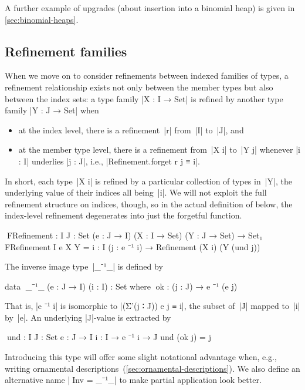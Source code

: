 
A further example of upgrades (about insertion into a binomial heap) is given in \autoref{sec:binomial-heaps}.

\subsection{Refinement families}
\label{sec:refinement-families}

When we move on to consider refinements between indexed families of types, a refinement relationship exists not only between the member types but also between the index sets: a type family |X : I → Set| is refined by another type family |Y : J → Set| when
\begin{itemize}
\item at the index level, there is a refinement~|r| from~|I| to~|J|, and
\item at the member type level, there is a refinement from~|X i| to~|Y j| whenever |i : I| underlies |j : J|, i.e., |Refinement.forget r j ≡ i|.
\end{itemize}
In short, each type~|X i| is refined by a particular collection of types in~|Y|, the underlying value of their indices all being~|i|.
We will not exploit the full refinement structure on indices, though, so in the actual definition of  below, the index-level refinement degenerates into just the forgetful function.
\begin{code}
^^^FRefinement : {I J : Set} (e : J → I) (X : I → Set) (Y : J → Set) → Set₁
FRefinement {I} e X Y = {i : I} (j : e ⁻¹ i) → Refinement (X i) (Y (und j))
\end{code}
The inverse image type~|_⁻¹_| is defined by
\begin{code}
data ^^^_⁻¹_ (e : J → I) (i : I) : Set where
  ^^^ok : (j : J) → e ⁻¹ (e j)
\end{code}
That is, |e ⁻¹ i| is isomorphic to |(Σ'(j ∶ J)) e j ≡ i|, the subset of~|J| mapped to~|i| by~|e|.
An underlying |J|-value is extracted by
\begin{code}
^^^und : {I J : Set} {e : J → I} {i : I} → e ⁻¹ i → J
und (ok j) = j
\end{code}
Introducing this type will offer some slight notational advantage when, e.g., writing ornamental descriptions~(\autoref{sec:ornamental-descriptions}).
We also define an alternative name |^^^Inv = _⁻¹_| to make partial application look better.

